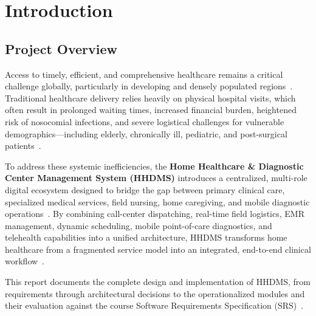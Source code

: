 \documentclass[conference]{IEEEtran}
\begin{document}
\section{Introduction}

\subsection{Project Overview}
Access to timely, efficient, and comprehensive healthcare remains a critical challenge globally, particularly in developing and densely populated regions~. Traditional healthcare delivery relies heavily on physical hospital visits, which often result in prolonged waiting times, increased financial burden, heightened risk of nosocomial infections, and severe logistical challenges for vulnerable demographics---including elderly, chronically ill, pediatric, and post-surgical patients~.

To address these systemic inefficiencies, the \textbf{Home Healthcare \& Diagnostic Center Management System (HHDMS)} introduces a centralized, multi-role digital ecosystem designed to bridge the gap between primary clinical care, specialized medical services, field nursing, home caregiving, and mobile diagnostic operations~\cite{srs2026}. By combining call-center dispatching, real-time field logistics, EMR management, dynamic scheduling, mobile point-of-care diagnostics, and telehealth capabilities into a unified architecture, HHDMS transforms home healthcare from a fragmented service model into an integrated, end-to-end clinical workflow~\cite{srs2026}.

This report documents the complete design and implementation of HHDMS, from requirements through architectural decisions to the operationalized modules and their evaluation against the course Software Requirements Specification (SRS)~\cite{srs2026}.
\end{document}
